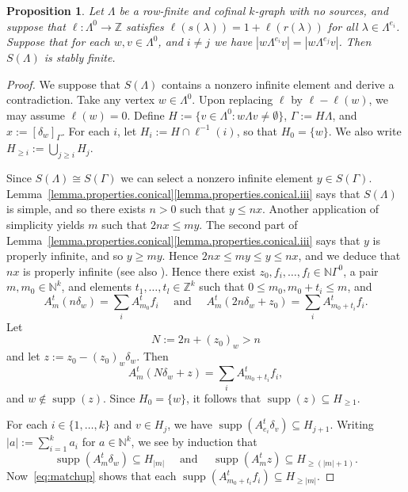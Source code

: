 \documentclass[a4paper, 12pt]{amsart}
\numberwithin{equation}{section}
\newcounter{theorem}
\newtheorem{prop}[theorem]{Proposition}
\theoremstyle{remark}
\theoremstyle{definition}
\begin{document}
\begin{prop}\label{prop.properties.dichotomy.three}
Let $\Lambda$ be a row-finite and cofinal $k$-graph with no sources, and suppose that
$\ell \colon \Lambda^0\to {\mathbb{Z}}$ satisfies $\ell(s(\lambda))=1+\ell(r(\lambda))$ for all
$\lambda\in\Lambda^{e_i}$. Suppose that for each $w,v\in \Lambda^0$, and $i\neq j$ we
have $|w\Lambda^{e_i}v|=|w\Lambda^{e_j}v|$. Then $S(\Lambda)$ is stably finite.
\end{prop}
\begin{proof}
We suppose that $S(\Lambda)$ contains a nonzero infinite element and derive a
contradiction. Take any vertex $w\in \Lambda^0$. Upon replacing $\ell$ by $\ell-\ell(w)$,
we may assume $\ell(w)=0$. Define $H:=\{v\in \Lambda^0: w\Lambda v\neq \emptyset\}$,
$\Gamma:=H\Lambda$, and $x:={{[{\delta_w}]_\Gamma}}$. For each $i$, let $H_i := H \cap
\ell^{-1}(i)$, so that $H_0 = \{w\}$. We also write $H_{\ge i} := \bigcup_{j \ge i} H_j$.

Since $S(\Lambda)\cong S(\Gamma)$ we can select a nonzero infinite element $y\in
S(\Gamma)$. Lemma~\ref{lemma.properties.conical}\eqref{lemma.properties.conical.iii} says that $S(\Lambda)$ is simple,
and so there exists $n > 0$ such that $y \le nx$. Another application of simplicity
yields $m$ such that $2nx \le my$. The second part of
Lemma~\ref{lemma.properties.conical}\eqref{lemma.properties.conical.iii} says that $y$ is properly infinite, and so $y
\ge my$. Hence $2nx \le my \le y \le nx$, and we deduce that $nx$ is properly infinite
(see also \cite[Lemma~2.9]{MR2806681}). Hence there exist $z_0, f_i, \dots, f_l \in {\mathbb{N}}
\Gamma^0$, a pair $m,m_0\in {\mathbb{N}}^k$, and elements $t_1, \dots, t_l\in {\mathbb{Z}}^k$ such that
$0\leq m_0, m_0+t_i\leq m$, and
\begin{equation}\label{eq:matchups}
    A^t_m (n \delta_w)=\sum_iA^t_{m_0}f_i \quad\text{ and }\quad A^t_m(2n \delta_w + z_0) = \sum_i A^t_{m_0+t_i}f_i.
\end{equation}
Let
\begin{equation}\label{eq:Ndef}
    N := 2n + (z_0)_w > n
\end{equation}
and let $z := z_0 - (z_0)_w \delta_w$. Then
\begin{equation}\label{eq:matchup}
    A^t_m(N \delta_w + z) = \sum_i A^t_{m_0+t_i}f_i,
\end{equation}
and $w \not\in {\operatorname{supp}}(z)$. Since $H_0 = \{w\}$, it follows that ${\operatorname{supp}}(z) \subseteq H_{\ge
1}$.

For each $i\in \{1,\dots, k\}$ and $v\in H_j$, we have ${\operatorname{supp}}(A^t_{e_i} \delta_v) \subseteq
H_{j+1}$. Writing $|a| := \sum_{i=1}^k a_i$ for $a \in {\mathbb{N}}^k$, we see by induction that
\[
{\operatorname{supp}}(A^t_m \delta_w) \subseteq H_{|m|}\quad\text{ and }\quad
    {\operatorname{supp}}(A^t_m z) \subseteq H_{\ge (|m|+1)}.
\]
Now~\eqref{eq:matchup} shows that each ${\operatorname{supp}}(A^t_{m_0+t_i}f_i) \subseteq H_{\ge |m|}$.


\end{proof}
\end{document}
